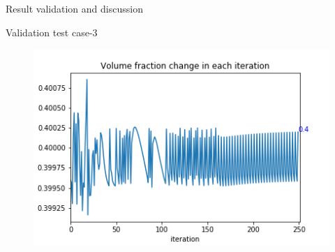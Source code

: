 \documentclass[a4paper,12pt,times]{article}
\begin{document}
\begin{section}{Result validation and discussion}
\begin{subsection}{Validation test case-3}
\begin{figure}[H]
	\begin{minipage}{.5\textwidth}
		\centering
		\includegraphics[width=1\linewidth]{OC_03_Volume_fractionVSiteration.png}
		\label{VC-06.6}
	\end{minipage}
\end{figure} 


\end{subsection}
\end{section}
\end{document}
